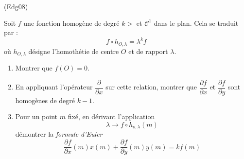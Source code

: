 \begin{tiny}(Edg08)\end{tiny}
Soit $f$ une fonction homogène de degré $k>$ et $\mathcal{C}^1$ dans le plan. Cela se traduit par :
\begin{displaymath}
 f\circ h_{O,\lambda}=\lambda^kf
\end{displaymath}
où $h_{O,\lambda}$ désigne l'homothétie de centre $O$ et de rapport $\lambda$.
\begin{enumerate}
 \item Montrer que $f(O)=0$.
 \item En appliquant l'opérateur $\dfrac{\partial}{\partial x}$ sur cette relation, montrer que $\dfrac{\partial f}{\partial x}$ et $\dfrac{\partial f}{\partial y}$ sont homogènes de degré $k-1$.
\item Pour un point $m$ fixé, en dérivant l'application
\[\lambda \rightarrow f\circ h_{o,\lambda}(m)\]
démontrer la \emph{formule d'Euler} 
\begin{displaymath}
 \dfrac{\partial f}{\partial x}(m)x(m) + \dfrac{\partial f}{\partial y}(m)y(m) = kf(m)
\end{displaymath}

\end{enumerate}
